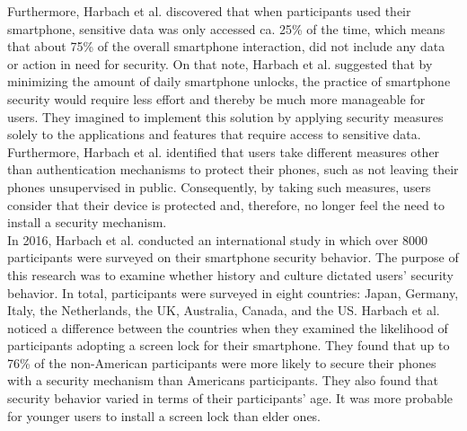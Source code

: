 Furthermore, Harbach et al. \cite{harbach} discovered that when participants used their smartphone, sensitive data was only accessed ca. 25\% of the time, which means that about 75\% of the overall smartphone interaction, did not include any data or action in need for security. On that note, Harbach et al. \cite{harbach} suggested that by minimizing the amount of daily smartphone unlocks, the practice of smartphone security would require less effort and thereby be much more manageable for users. They imagined to implement this solution by applying security measures solely to the applications and features that require access to sensitive data. Furthermore, Harbach et al. \cite{harbach} identified that users take different measures other than authentication mechanisms to protect their phones, such as not leaving their phones unsupervised in public. Consequently, by taking such measures, users consider that their device is protected and, therefore, no longer feel the need to install a security mechanism. \\

In 2016, Harbach et al. \cite{Harbach:2016} conducted an international study in which over 8000 participants were surveyed on their smartphone security behavior. The purpose of this research was to examine whether history and culture dictated users' security behavior. In total, participants were surveyed in eight countries: Japan, Germany, Italy, the Netherlands, the UK, Australia, Canada, and the US. Harbach et al. \cite{Harbach:2016} noticed a difference between the countries when they examined the likelihood of participants adopting a screen lock for their smartphone. They found that up to 76\% of the non-American participants were more likely to secure their phones with a security mechanism than Americans participants. They also found that security behavior varied in terms of their participants' age. It was more probable for younger users to install a screen lock than elder ones.\\

